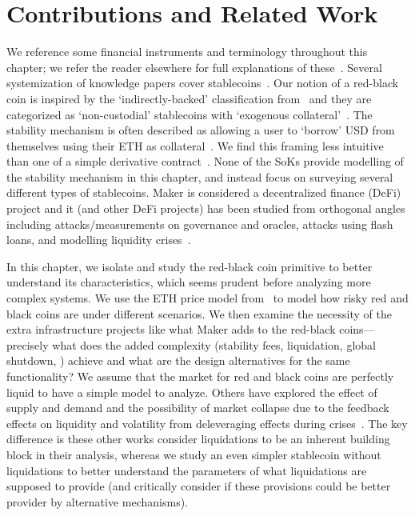 \section{Contributions and Related Work} We reference some financial instruments and terminology throughout this chapter; we refer the reader elsewhere for full explanations of these~\cite{Har03}. Several systemization of knowledge papers cover stablecoins~\cite{PHP+19,MSS20,CDM20,klages2020stablecoins}. Our notion of a red-black coin is inspired by the `indirectly-backed' classification from~\cite{CDM20} and they are categorized as `non-custodial' stablecoins with `exogenous collateral'~\cite{klages2020stablecoins}. The stability mechanism is often described as allowing a user to `borrow' USD from themselves using their ETH as collateral~\cite{PHP+19,MSS20}. We find this framing less intuitive than one of a simple derivative contract~\cite{CDM20}. None of the SoKs provide modelling of the stability mechanism in this chapter, and instead focus on surveying several different types of stablecoins. Maker is considered a decentralized finance (DeFi) project and it (and other DeFi projects) has been studied from orthogonal angles including attacks/measurements on governance and oracles, attacks using flash loans, and modelling liquidity crises~\cite{GRB20,GPH+20,QZLG20,KMM20,klages2020stablecoins}.

In this chapter, we isolate and study the red-black coin primitive to better understand its characteristics, which seems prudent before analyzing more complex systems. We use the ETH price model from~\cite{GPH+20} to model how risky red and black coins are under different scenarios. We then examine the necessity of the extra infrastructure projects like what Maker adds to the red-black coins---precisely what does the added complexity (\eg stability fees, liquidation, global shutdown, \etc) achieve and what are the design alternatives for the same functionality? We assume that the market for red and black coins are perfectly liquid to have a simple model to analyze. Others have explored the effect of supply and demand and the possibility of market collapse due to the feedback effects on liquidity and volatility from deleveraging effects during crises~\cite{klages2019stability,KMM20}. The key difference is these other works consider liquidations to be an inherent building block in their analysis, whereas we study an even simpler stablecoin without liquidations to better understand the parameters of what liquidations are supposed to provide (and critically consider if these provisions could be better provider by alternative mechanisms).  

